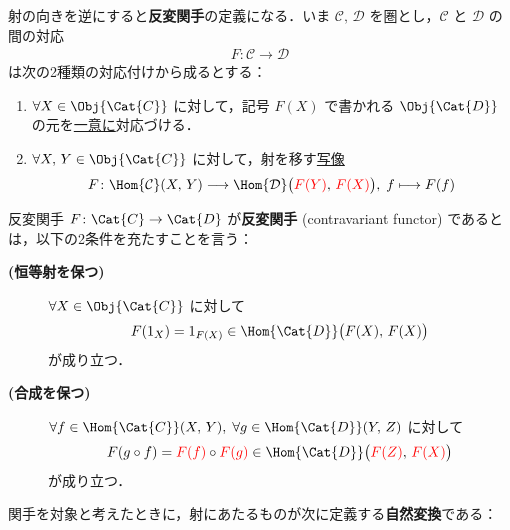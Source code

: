 \documentclass[algtopo_main]{subfiles}
\begin{document}
射の向きを逆にすると\textbf{反変関手}の定義になる．いま $\mathcal{C},\, \mathcal{D}$ を圏とし，$\mathcal{C}$ と $\mathcal{D}$ の間の対応
\begin{align}
    F \colon \mathcal{C} \longrightarrow\mathcal{D}
\end{align}
は次の2種類の対応付けから成るとする：
\begin{enumerate}
    \item $\forall X \in \Obj{\Cat{C}}$ に対して，記号 $F(X)$ で書かれる $\Obj{\Cat{D}}$ の元を\underline{一意に}対応づける．
    \item $\forall X,\, Y \in \Obj{\Cat{C}}$ に対して，射を移す\underline{写像}
    \begin{align}
        F \colon \Hom{\mathcal{C}}(X,\, Y) \longrightarrow \Hom{\mathcal{D}} \bigl( \textcolor{red}{F(Y)},\, \textcolor{red}{F(X)} \bigr),\; f \longmapsto F(f)
    \end{align}
\end{enumerate}

\begin{mydef}[label=def:contrav]{反変関手}
    $F \colon \Cat{C} \to \Cat{D}$ が\textbf{反変関手} (contravariant functor) であるとは，以下の2条件を充たすことを言う：
    \begin{description}
        \item[\textbf{(恒等射を保つ)}]
        
        $\forall X \in \Obj{\Cat{C}}$ に対して
        \begin{align}
            F(1_X) = 1_{F(X)} \in \Hom{\Cat{D}} \bigl( F(X),\, F(X) \bigr) 
        \end{align}
        が成り立つ．
        \item[\textbf{(合成を保つ)}]

        $\forall f \in \Hom{\Cat{C}}(X,\, Y),\; \forall g \in \Hom{\Cat{D}}(Y,\, Z)$ に対して
        \begin{align}
            F(g \circ f) = \textcolor{red}{F(f)} \circ \textcolor{red}{F(g)} \in \Hom{\Cat{D}}\bigl( \textcolor{red}{F(Z)},\, \textcolor{red}{F(X)} \bigr) 
        \end{align}
        が成り立つ．
    \end{description}
\end{mydef}

関手を対象と考えたときに，射にあたるものが次に定義する\textbf{自然変換}である：
\end{document}
